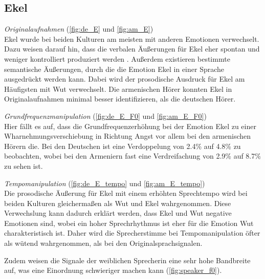 \documentclass[11pt,a4paper,headsepline,twoside,toc=bibliography]{scrreprt}
\begin{document}
\subsection{Ekel}
\label{sec:Ekel}

\emph{Originalaufnahmen} (\autoref{fig:de_E} und \ref{fig:am_E}) \\
Ekel wurde bei beiden Kulturen am meisten mit anderen Emotionen verwechselt. Dazu weisen \citeauthor{Banse1996} darauf hin, dass die verbalen Äußerungen für Ekel eher spontan und weniger kontrolliert produziert werden \autocite{Banse1996}. Außerdem existieren bestimmte semantische Äußerungen, durch die die Emotion Ekel in einer Sprache ausgedrückt werden kann.  Dabei wird der prosodische Ausdruck für Ekel am Häufigsten mit Wut verwechselt. Die armenischen Hörer konnten Ekel in Originalaufnahmen minimal besser identifizieren, als die deutschen Hörer. 


\noindent
\emph{Grundfrequenzmanipulation} (\autoref{fig:de_E_F0} und \ref{fig:am_E_F0}) \\
Hier fällt es auf, dass die Grundfrequenzerhöhung bei der Emotion Ekel zu einer Wharnehmungsverschiebung in Richtung Angst vor allem bei den armenischen Hörern die. Bei den Deutschen ist eine Verdoppelung von 2.4\% auf 4.8\% zu beobachten, wobei bei den Armeniern fast eine Verdreifachung von 2.9\% auf 8.7\% zu sehen ist.


\noindent
\emph{Tempomanipulation} (\autoref{fig:de_E_tempo} und \ref{fig:am_E_tempo}) \\
Die prosodische Äußerung für Ekel mit einem erhöhten Sprechtempo wird bei beiden Kulturen gleichermaßen als Wut und Ekel wahrgenommen. Diese Verwechslung kann dadurch erklärt werden, dass Ekel und Wut negative Emotionen sind, wobei ein hoher Sprechrhythmus ist eher für die Emotion Wut charakteristisch ist. Daher wird die Sprecherstimme bei Tempomanipulation öfter als wütend wahrgenommen, als bei den Originalsprachsignalen. 

Zudem weisen die Signale der weiblichen Sprecherin eine sehr hohe Bandbreite auf, was eine Einordnung schwieriger machen kann (\autoref{fig:speaker_f0}).
\end{document}
